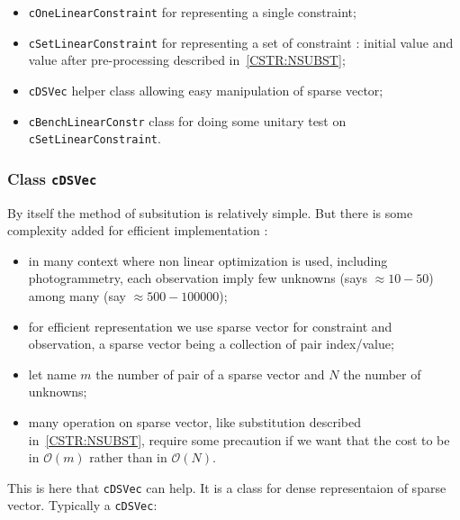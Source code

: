 \begin{itemize}
    \item  {\tt cOneLinearConstraint}  for representing a single constraint;
    \item  {\tt cSetLinearConstraint}  for representing a set of constraint  : initial value and value after
           pre-processing described in~\ref{CSTR:NSUBST};
    \item  {\tt cDSVec}   helper class allowing easy manipulation of sparse vector;
    \item  {\tt cBenchLinearConstr}   class for doing some unitary test on {\tt cSetLinearConstraint}.
\end{itemize}


\subsubsection{Class {\tt cDSVec} }

By itself the method of subsitution is relatively simple. But there is some complexity added 
for efficient implementation :

\begin{itemize}
    \item  in many context where non linear optimization is used, including photogrammetry,  each observation
           imply few unknowns (says $\approx 10-50$)  among many (say $\approx 500-100000$);

    \item  for efficient representation we use sparse vector for constraint and observation, 
           a sparse vector being a collection of pair index/value;

     \item let name $m$  the number of pair of a sparse vector and $N$ the number of unknowns;

    \item  many operation on sparse vector, like substitution described in~\ref{CSTR:NSUBST}, require some
           precaution if we want that the cost to be in $\mathcal{O}(m)$  rather than in $\mathcal{O}(N)$.
\end{itemize}


This is here that  {\tt cDSVec}  can help. It is a class for dense representaion of sparse vector. Typically a  {\tt cDSVec}:

